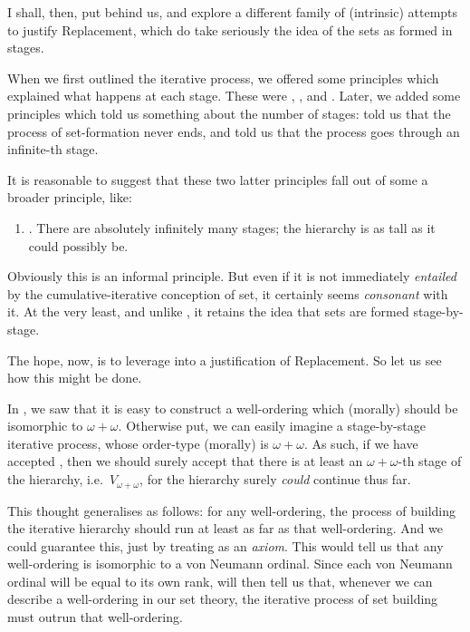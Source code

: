 \documentclass[../../../include/open-logic-section]{subfiles}
\begin{document}
I shall, then, put \limofsize{} behind us, and explore a different family of (intrinsic) attempts to justify Replacement, which do take seriously the idea of the sets as formed in stages.

When we first outlined the iterative process, we offered some principles which explained what happens at each stage. These were \stageshier, \stagesord, and \stagesacc. Later, we added some principles which told us something about the number of stages: \stagessucc{} told us that the process of set-formation never ends, and \stagesinf{} told us that the process goes through an infinite-th stage. 

It is reasonable to suggest that these two latter principles fall out of some a broader principle, like:
\begin{enumerate}
	\item[] \stagesinex. There are absolutely infinitely many stages; the hierarchy is as tall as it could possibly be.
\end{enumerate}
Obviously this is an informal principle. But even if it is not immediately \emph{entailed} by the cumulative-iterative conception of set, it certainly seems \emph{consonant} with it. At the very least, and unlike \limofsize, it retains the idea that sets are formed stage-by-stage. 

The hope, now, is to leverage \stagesinex{} into a justification of Replacement. So let us see how this might be done. 

In , we saw that it is easy to construct a well-ordering which (morally) should be isomorphic to $\omega+\omega$. Otherwise put, we can easily imagine a stage-by-stage iterative process, whose order-type (morally) is $\omega+\omega$. As such, if we have accepted \stagesinex, then we should surely accept that there is at least an $\omega+\omega$-th stage of the hierarchy, i.e.\ $V_{\omega+\omega}$, for the hierarchy surely \emph{could} continue thus far. 

This thought generalises as follows: for any well-ordering, the process of building the iterative hierarchy should run at least as far as that well-ordering. And we could guarantee this, just by treating  as an \emph{axiom}. This would tell us that any well-ordering is isomorphic to a von Neumann ordinal. Since each von Neumann ordinal will be equal to its own rank,   will then tell us that, whenever we can describe a well-ordering in our set theory, the iterative process of set building must outrun that well-ordering. 
\end{document}
